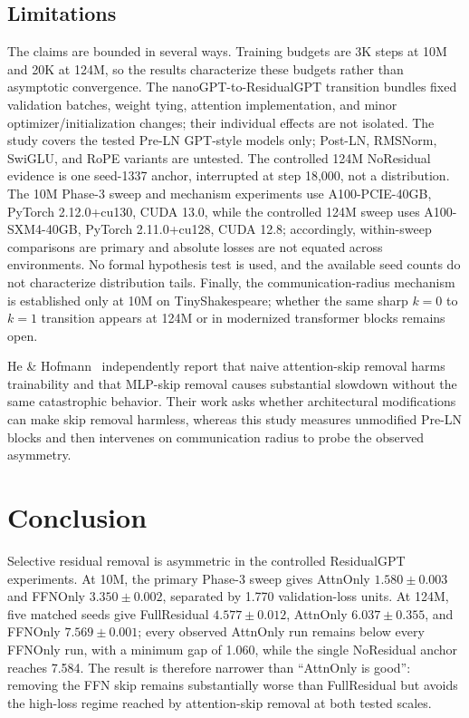 \documentclass[11pt]{article}
\begin{document}
\subsection{Limitations}\label{sec:limitations}
The claims are bounded in several ways. Training budgets are 3K steps at 10M and 20K at 124M, so the results characterize these budgets rather than asymptotic convergence. The nanoGPT-to-ResidualGPT transition bundles fixed validation batches, weight tying, attention implementation, and minor optimizer/initialization changes; their individual effects are not isolated. The study covers the tested Pre-LN GPT-style models only; Post-LN, RMSNorm, SwiGLU, and RoPE variants are untested. The controlled 124M NoResidual evidence is one seed-1337 anchor, interrupted at step 18,000, not a distribution. The 10M Phase-3 sweep and mechanism experiments use A100-PCIE-40GB, PyTorch 2.12.0+cu130, CUDA 13.0, while the controlled 124M sweep uses A100-SXM4-40GB, PyTorch 2.11.0+cu128, CUDA 12.8; accordingly, within-sweep comparisons are primary and absolute losses are not equated across environments. No formal hypothesis test is used, and the available seed counts do not characterize distribution tails. Finally, the communication-radius mechanism is established only at 10M on TinyShakespeare; whether the same sharp $k=0$ to $k=1$ transition appears at 124M or in modernized transformer blocks remains open.

He \& Hofmann~\cite{hehofmann2024} independently report that naive attention-skip removal harms trainability and that MLP-skip removal causes substantial slowdown without the same catastrophic behavior. Their work asks whether architectural modifications can make skip removal harmless, whereas this study measures unmodified Pre-LN blocks and then intervenes on communication radius to probe the observed asymmetry.

\section{Conclusion}
Selective residual removal is asymmetric in the controlled ResidualGPT experiments. At 10M, the primary Phase-3 sweep gives AttnOnly $1.580 \pm 0.003$ and FFNOnly $3.350 \pm 0.002$, separated by 1.770 validation-loss units. At 124M, five matched seeds give FullResidual $4.577 \pm 0.012$, AttnOnly $6.037 \pm 0.355$, and FFNOnly $7.569 \pm 0.001$; every observed AttnOnly run remains below every FFNOnly run, with a minimum gap of 1.060, while the single NoResidual anchor reaches 7.584. The result is therefore narrower than ``AttnOnly is good'': removing the FFN skip remains substantially worse than FullResidual but avoids the high-loss regime reached by attention-skip removal at both tested scales.
\end{document}
